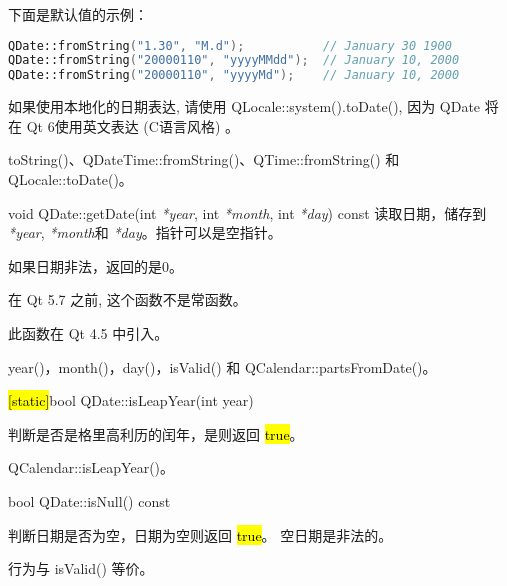 下面是默认值的示例：

\begin{lstlisting}[language=C++]
QDate::fromString("1.30", "M.d");           // January 30 1900
QDate::fromString("20000110", "yyyyMMdd");  // January 10, 2000
QDate::fromString("20000110", "yyyyMd");    // January 10, 2000
\end{lstlisting}



\begin{notice}
如果使用本地化的日期表达, 请使用 QLocale::system().toDate(), 因为 QDate 将在 Qt 6使用英文表达 (C语言风格) 。
	
\end{notice}


\begin{notice}[另请参阅]
toString()、QDateTime::fromString()、QTime::fromString() 和 QLocale::toDate()。
\end{notice}


\splitLine

void QDate::getDate(int  \emph{*year}, int \emph{*month}, int \emph{*day}) const
读取日期，储存到 \emph{*year},  \emph{*month}和 \emph{*day}。指针可以是空指针。

如果日期非法，返回的是0。



\begin{notice}
 在 Qt 5.7 之前, 这个函数不是常函数。
\end{notice}

此函数在 Qt 4.5 中引入。



\begin{notice}[另请参阅]
year()，month()，day()，isValid() 和
QCalendar::partsFromDate()。
\end{notice}

\splitLine

\hl{[static]}bool QDate::isLeapYear(int year)

判断是否是格里高利历的闰年，是则返回 \hl{true}。


\begin{notice}[另请参阅]
QCalendar::isLeapYear()。
\end{notice}


\splitLine

bool QDate::isNull() const

判断日期是否为空，日期为空则返回 \hl{true}。 空日期是非法的。

\begin{notice}
行为与 isValid() 等价。
\end{notice}

